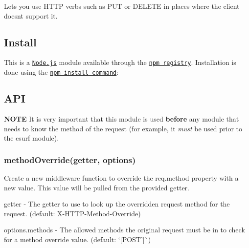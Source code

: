 \href{https://npmjs.org/package/method-override}{\tt } \href{https://npmjs.org/package/method-override}{\tt } \href{https://travis-ci.org/expressjs/method-override}{\tt } \href{https://coveralls.io/r/expressjs/method-override?branch=master}{\tt }

Lets you use H\+T\+TP verbs such as P\+UT or D\+E\+L\+E\+TE in places where the client doesn\textquotesingle{}t support it.

\subsection*{Install}

This is a \href{https://nodejs.org/en/}{\tt Node.\+js} module available through the \href{https://www.npmjs.com/}{\tt npm registry}. Installation is done using the \href{https://docs.npmjs.com/getting-started/installing-npm-packages-locally}{\tt {\ttfamily npm install} command}\+:




\subsection*{A\+PI}

{\bfseries N\+O\+TE} It is very important that this module is used {\bfseries before} any module that needs to know the method of the request (for example, it {\itshape must} be used prior to the {\ttfamily csurf} module).

\subsubsection*{method\+Override(getter, options)}

Create a new middleware function to override the {\ttfamily req.\+method} property with a new value. This value will be pulled from the provided {\ttfamily getter}.


\begin{DoxyItemize}
\item {\ttfamily getter} -\/ The getter to use to look up the overridden request method for the request. (default\+: {\ttfamily X-\/\+H\+T\+T\+P-\/\+Method-\/\+Override})
\item {\ttfamily options.\+methods} -\/ The allowed methods the original request must be in to check for a method override value. (default\+: `\mbox{[}\textquotesingle{}P\+O\+ST'\mbox{]}\`{})
\end{DoxyItemize}

